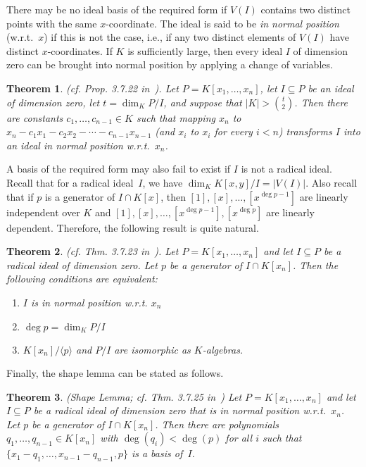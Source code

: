 \documentclass[a4paper,draft]{amsart}
\def\<#1>{\langle#1\rangle}
\newtheorem{thm}{Theorem}
\begin{document}
There may be no ideal basis of the required form if $V(I)$ contains two distinct
points with the same $x$-coordinate. The ideal is said to be \emph{in normal position}
(w.r.t.~$x$) if this is not the case, i.e., if any two distinct elements of $V(I)$
have distinct $x$-coordinates. If $K$ is sufficiently large, then every ideal $I$
of dimension zero can be brought into normal position by applying a change of variables.

\begin{thm}\label{thm:1} (cf. Prop. 3.7.22 in~\cite{kreuzer00}). Let $P=K[x_1,\dots,x_n]$,
  let $I\subseteq P$ be an ideal of dimension zero,
  let $t=\dim_K P/I$, and suppose that $|K|>\binom t2$. Then
  there are constants $c_1,\dots,c_{n-1}\in K$ such that mapping $x_n$ to
  $x_n-c_1x_1-c_2x_2-\cdots-c_{n-1}x_{n-1}$ (and $x_i$ to $x_i$ for every $i<n$)
  transforms $I$ into an ideal in normal position w.r.t.~$x_n$.
\end{thm}

A basis of the required form may also fail to exist if $I$ is not a radical
ideal. Recall that for a radical ideal~$I$, we have $\dim_K K[x,y]/I=|V(I)|$. Also
recall that if $p$ is a generator of $I\cap K[x]$, then
$[1],[x],\dots,[x^{\deg p-1}]$ are linearly independent over $K$
and $[1],[x],\dots,[x^{\deg p-1}],[x^{\deg p}]$ are linearly dependent.
Therefore, the following result is quite natural.

\begin{thm}\label{thm:2} (cf. Thm. 3.7.23 in~\cite{kreuzer00}). Let $P=K[x_1,\dots,x_n]$
  and let $I\subseteq P$ be a radical ideal of dimension zero.
  Let $p$ be a generator of $I\cap K[x_n]$. Then
  the following conditions are equivalent:
  \begin{enumerate}
  \item $I$ is in normal position w.r.t. $x_n$
  \item $\deg p=\dim_K P/I$
  \item $K[x_n]/\<p>$ and $P/I$ are isomorphic as $K$-algebras.
  \end{enumerate}
\end{thm}

Finally, the shape lemma can be stated as follows.

\begin{thm}\label{thm:3} (Shape Lemma; cf. Thm. 3.7.25 in~\cite{kreuzer00}) Let $P=K[x_1,\dots,x_n]$
  and let $I\subseteq P$ be a radical ideal of dimension zero that is in normal position
  w.r.t.~$x_n$. Let $p$ be a generator of $I\cap K[x_n]$. Then
  there are polynomials $q_1,\dots,q_{n-1}\in K[x_n]$ with $\deg(q_i)<\deg(p)$
  for all $i$ such that
  $\{x_1-q_1,\dots,x_{n-1}-q_{n-1}, p\}$ is a basis of~$I$.
\end{thm}
\end{document}
